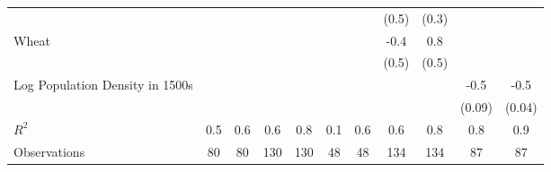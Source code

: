 {\begin{tabular}{l*{10}{c}}
                    &                     &                     &                     &                     &                     &                     &       (0.5)         &       (0.3)         &                     &                     \\
Wheat               &                     &                     &                     &                     &                     &                     &        -0.4         &         0.8         &                     &                     \\
                    &                     &                     &                     &                     &                     &                     &       (0.5)         &       (0.5)         &                     &                     \\
Log Population Density in 1500s&                     &                     &                     &                     &                     &                     &                     &                     &        -0.5\sym{***}&        -0.5\sym{***}\\
                    &                     &                     &                     &                     &                     &                     &                     &                     &      (0.09)         &      (0.04)         \\
\(R^{2}\)           &         0.5         &         0.6         &         0.6         &         0.8         &         0.1         &         0.6         &         0.6         &         0.8         &         0.8         &         0.9         \\
Observations        &          80         &          80         &         130         &         130         &          48         &          48         &         134         &         134         &          87         &          87         \\
\end{tabular}
}
